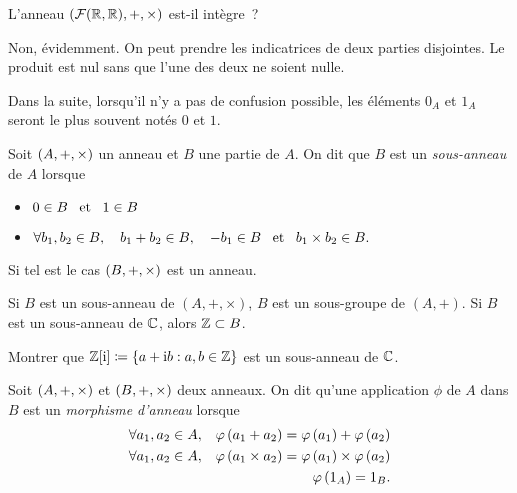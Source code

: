 \documentclass{magnolia}
\begin{document}
\begin{exoUnique}
\exo L'anneau $(\mathcal{F}(\mathbb{R},\mathbb{R}),+,\times)$ est-il intègre~?
\end{exoUnique}

\begin{sol}
Non, évidemment. On peut prendre les indicatrices de deux parties disjointes. Le produit est nul sans que l'une des deux ne soient nulle.
\end{sol}

Dans la suite, lorsqu'il n'y a pas de confusion possible,
  les éléments $0_A$ et $1_A$ seront le plus souvent notés $0$ et $1$.

\begin{definition}
Soit $\left(A,+,\times\right)$ un anneau et $B$ une partie de $A$. On dit que $B$ est un
\emph{sous-anneau} de $A$ lorsque
\begin{itemize}
\item $0\in B \quad\!\text{et}\quad\! 1\in B$
\item $\forall b_1,b_2\in B ,\quad b_1+b_2\in B ,\quad -b_1\in B \quad\!\text{et}\quad\! b_1\times b_2\in B.$
\end{itemize}
Si tel est le cas $\left(B,+,\times\right)$ est un anneau.
\end{definition}

\begin{remarques}
\remarque Si $B$ est un sous-anneau de $(A,+,\times)$, $B$ est un
  sous-groupe de $(A,+)$.
\remarque Si $B$ est un sous-anneau de $\mathbb{C}$, alors $\mathbb{Z}\subset B$.
\end{remarques}

\begin{exoUnique}
\exo Montrer que $\mathbb{Z}[{\rm i}]\coloneqq\left\{a+{\rm i} b : a,b\in\mathbb{Z}\right\}$ est un sous-anneau de $\mathbb{C}$.
\end{exoUnique}

\begin{definition}
Soit $\left(A,+,\times\right)$ et $\left(B,+,\times\right)$ deux anneaux. On dit qu'une
application $\phi$ de $A$ dans $B$ est un \emph{morphisme d'anneau} lorsque
\begin{eqnarray*}
\forall a_1,a_2\in A, & & \varphi\left(a_1+ a_2\right)=\varphi\left(a_1\right)+\varphi\left(a_2\right)\\
\forall a_1,a_2\in A, & & \varphi\left(a_1\times a_2\right)=\varphi\left(a_1\right)\times\varphi\left(a_2\right)\\
& & \varphi\left(1_A\right)=1_B.
\end{eqnarray*}
\end{definition}
\end{document}
